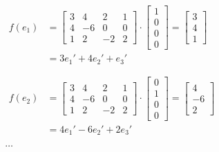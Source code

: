 \documentclass[italian]{article}
\begin{document}
\begin{gather*}
	\begin{split}
		f(e_1) &= 
		\begin{bmatrix}
			3 & 4 & 2 & 1 \\
			4 & -6 & 0 & 0 \\
			1 & 2 & -2 & 2
		\end{bmatrix}
		\cdot
		\begin{bmatrix}
			1 \\ 0 \\ 0 \\ 0
		\end{bmatrix}
		=
		\begin{bmatrix}
			3 \\ 4 \\ 1
		\end{bmatrix}\\
		&= 3e_1' + 4e_2' + e_3'
	\end{split} \\\\
	\begin{split}
		f(e_2) &= 
		\begin{bmatrix}
			3 & 4 & 2 & 1 \\
			4 & -6 & 0 & 0 \\
			1 & 2 & -2 & 2
		\end{bmatrix}
		\cdot
		\begin{bmatrix}
			0 \\ 1 \\ 0 \\ 0
		\end{bmatrix}
		=
		\begin{bmatrix}
			4 \\ -6 \\ 2
		\end{bmatrix}\\
		&= 4e_1' - 6e_2' + 2e_3'
	\end{split} \\\\
	\dots
\end{gather*}

\newpage
\end{document}
